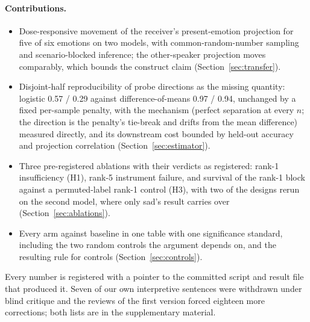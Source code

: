 \documentclass{article}
\begin{document}
\paragraph{Contributions.}
\begin{itemize}[leftmargin=1.2em,itemsep=1pt,topsep=2pt]
\item Dose-responsive movement of the receiver's present-emotion projection for five of six emotions on two models, with common-random-number sampling and scenario-blocked inference; the other-speaker projection moves comparably, which bounds the construct claim (Section~\ref{sec:transfer}).
\item Disjoint-half reproducibility of probe directions as the missing quantity: logistic 0.57 / 0.29 against difference-of-means 0.97 / 0.94, unchanged by a fixed per-sample penalty, with the mechanism (perfect separation at every $n$; the direction is the penalty's tie-break and drifts from the mean difference) measured directly, and its downstream cost bounded by held-out accuracy and projection correlation (Section~\ref{sec:estimator}).
\item Three pre-registered ablations with their verdicts as registered: rank-1 insufficiency (H1), rank-5 instrument failure, and survival of the rank-1 block against a permuted-label rank-1 control (H3), with two of the designs rerun on the second model, where only sad's result carries over (Section~\ref{sec:ablations}).
\item Every arm against baseline in one table with one significance standard, including the two random controls the argument depends on, and the resulting rule for controls (Section~\ref{sec:controls}).
\end{itemize}
Every number is registered with a pointer to the committed script and result file that produced it. Seven of our own interpretive sentences were withdrawn under blind critique and the reviews of the first version forced eighteen more corrections; both lists are in the supplementary material.
\end{document}
